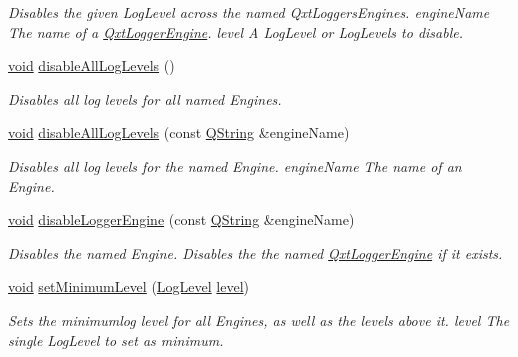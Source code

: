 \begin{DoxyCompactItemize}
\begin{DoxyCompactList}\small\item\em Disables the given Log\-Level across the named Qxt\-Loggers\-Engines. {\itshape engine\-Name} The name of a \hyperlink{class_qxt_logger_engine}{Qxt\-Logger\-Engine}. {\itshape level} A Log\-Level or Log\-Levels to disable. \end{DoxyCompactList}\item 
\hyperlink{group___u_a_v_objects_plugin_ga444cf2ff3f0ecbe028adce838d373f5c}{void} \hyperlink{class_qxt_logger_ad6c8842f366ceba102696ebffa880c02}{disable\-All\-Log\-Levels} ()
\begin{DoxyCompactList}\small\item\em Disables all log levels for all named Engines. \end{DoxyCompactList}\item 
\hyperlink{group___u_a_v_objects_plugin_ga444cf2ff3f0ecbe028adce838d373f5c}{void} \hyperlink{class_qxt_logger_a468bc6387ded325a9c2cd0b63ba16581}{disable\-All\-Log\-Levels} (const \hyperlink{group___u_a_v_objects_plugin_gab9d252f49c333c94a72f97ce3105a32d}{Q\-String} \&engine\-Name)
\begin{DoxyCompactList}\small\item\em Disables all log levels for the named Engine. {\itshape engine\-Name} The name of an Engine. \end{DoxyCompactList}\item 
\hyperlink{group___u_a_v_objects_plugin_ga444cf2ff3f0ecbe028adce838d373f5c}{void} \hyperlink{class_qxt_logger_a310f8cba964fa9ac1062569629578cb2}{disable\-Logger\-Engine} (const \hyperlink{group___u_a_v_objects_plugin_gab9d252f49c333c94a72f97ce3105a32d}{Q\-String} \&engine\-Name)
\begin{DoxyCompactList}\small\item\em Disables the named Engine. Disables the the named \hyperlink{class_qxt_logger_engine}{Qxt\-Logger\-Engine} if it exists. \end{DoxyCompactList}\item 
\hyperlink{group___u_a_v_objects_plugin_ga444cf2ff3f0ecbe028adce838d373f5c}{void} \hyperlink{class_qxt_logger_a45fa02b7756edeff832c09ad94db959a}{set\-Minimum\-Level} (\hyperlink{class_qxt_logger_ac2071072628aa786466124cc32a324e7}{Log\-Level} \hyperlink{glext_8h_abc60a79088789bd61297bf5f9ff500d1}{level})
\begin{DoxyCompactList}\small\item\em Sets the minimumlog level for all Engines, as well as the levels above it. {\itshape level} The single Log\-Level to set as minimum. \end{DoxyCompactList}\item 

\end{DoxyCompactItemize}

